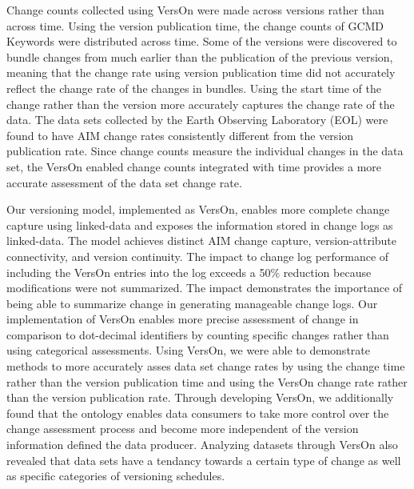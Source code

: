 Change counts collected using VersOn were made across versions rather than across time.
Using the version publication time, the change counts of GCMD Keywords were distributed across time.
Some of the versions were discovered to bundle changes from much earlier than the publication of the previous version, meaning that the change rate using version publication time did not accurately reflect the change rate of the changes in bundles.
Using the start time of the change rather than the version more accurately captures the change rate of the data.
The data sets collected by the Earth Observing Laboratory (EOL) were found to have AIM change rates consistently different from the version publication rate.
Since change counts measure the individual changes in the data set, the VersOn enabled change counts integrated with time provides a more accurate assessment of the data set change rate.

Our versioning model, implemented as VersOn, enables more complete change capture using linked-data and exposes the information stored in change logs as linked-data.
The model achieves distinct AIM change capture, version-attribute connectivity, and version continuity.
The impact to change log performance of including the VersOn entries into the log exceeds a 50\% reduction because modifications were not summarized.
The impact demonstrates the importance of being able to summarize change in generating manageable change logs.
Our implementation of VersOn enables more precise assessment of change in comparison to dot-decimal identifiers by counting specific changes rather than using categorical assessments.
Using VersOn, we were able to demonstrate methods to more accurately asses data set change rates by using the change time rather than the version publication time and using the VersOn change rate rather than the version publication rate.
Through developing VersOn, we additionally found that the ontology enables data consumers to take more control over the change assessment process and become more independent of the version information defined the data producer.
Analyzing datasets through VersOn also revealed that data sets have a tendancy towards a certain type of change as well as specific categories of versioning schedules.